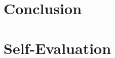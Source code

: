 \documentclass[conference]{IEEEtran}
\begin{document}



\section{Conclusion} \label{sec:conclusion}


\section{Self-Evaluation} \label{sec:self-evaluation}






%
%
%



\end{document}
